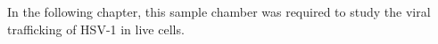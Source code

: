 In the following chapter, this sample chamber was required to study the viral trafficking of \gls{HSV}-1 in live cells.
%


